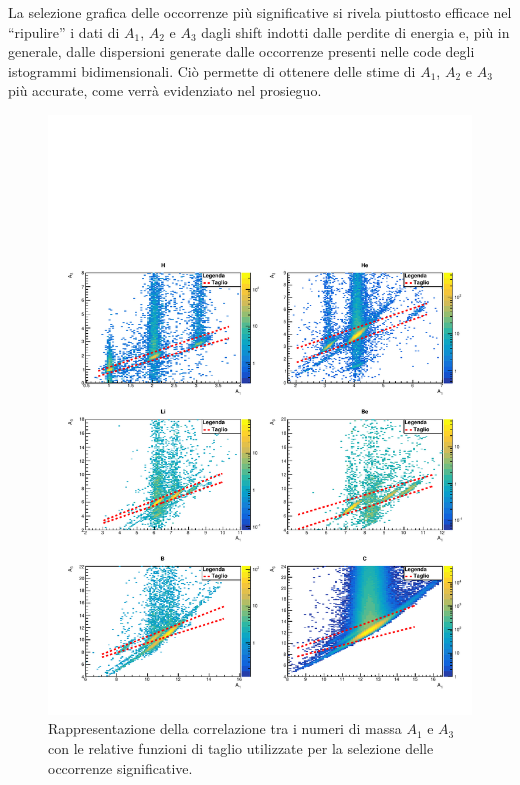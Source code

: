 \documentclass[12pt,a4paper,twoside]{report}
\begin{document}
	La selezione grafica delle occorrenze più significative si rivela piuttosto efficace nel ``ripulire'' i dati di $A_1$, $A_2$ e $A_3$ dagli shift indotti dalle perdite di energia e, più in generale, dalle dispersioni generate dalle occorrenze presenti nelle code degli istogrammi bidimensionali. Ciò permette di ottenere delle stime di $A_1$, $A_2$ e $A_3$ più accurate, come verrà evidenziato nel prosieguo.
	\begin{figure}[H]
		\centering
		\includegraphics[width=1.03\linewidth,center]{c_MultiCanvasCutLog2.pdf}
		\caption{Rappresentazione della correlazione tra i numeri di massa $A_1$ e $A_3$ con le relative funzioni di taglio utilizzate per la selezione delle occorrenze significative.}
		\label{fig:a2_cut}
	\end{figure}
\end{document}
